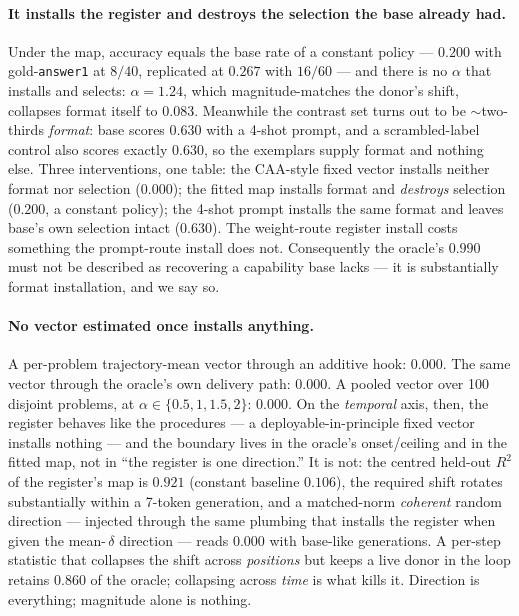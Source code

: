 \documentclass{article}
\begin{document}
\paragraph{It installs the register and destroys the selection the base already had.} Under the
map, accuracy equals the base rate of a constant policy --- $0.200$ with gold-\texttt{answer1} at
$8/40$, replicated at $0.267$ with $16/60$ --- and there is no $\alpha$ that installs and selects:
$\alpha{=}1.24$, which magnitude-matches the donor's shift, collapses format itself to $0.083$.
Meanwhile the contrast set turns out to be ${\sim}$two-thirds \emph{format}: base scores $0.630$
with a 4-shot prompt, and a scrambled-label control also scores exactly $0.630$, so the exemplars
supply format and nothing else. Three interventions, one table: the CAA-style fixed vector installs
neither format nor selection ($0.000$); the fitted map installs format and \emph{destroys}
selection ($0.200$, a constant policy); the 4-shot prompt installs the same format and leaves
base's own selection intact ($0.630$). The weight-route register install costs something the
prompt-route install does not. Consequently the oracle's $0.990$ must not be described as
recovering a capability base lacks --- it is substantially format installation, and we say so.

\paragraph{No vector estimated once installs anything.} A per-problem trajectory-mean vector
through an additive hook: $0.000$. The same vector through the oracle's own delivery path:
$0.000$. A pooled vector over 100 disjoint problems, at $\alpha \in \{0.5, 1, 1.5, 2\}$: $0.000$.
On the \emph{temporal} axis, then, the register behaves like the procedures --- a
deployable-in-principle fixed vector installs nothing --- and the boundary lives in the oracle's
onset/ceiling and in the fitted map, not in ``the register is one direction.'' It is not: the
centred held-out $R^2$ of the register's map is $0.921$ (constant baseline $0.106$), the required
shift rotates substantially within a 7-token generation, and a matched-norm \emph{coherent} random
direction --- injected through the same plumbing that installs the register when given the mean-\,$\delta$
direction --- reads $0.000$ with base-like generations. A per-step statistic that collapses the
shift across \emph{positions} but keeps a live donor in the loop retains $0.860$ of the oracle;
collapsing across \emph{time} is what kills it. Direction is everything; magnitude alone is
nothing.
\end{document}
